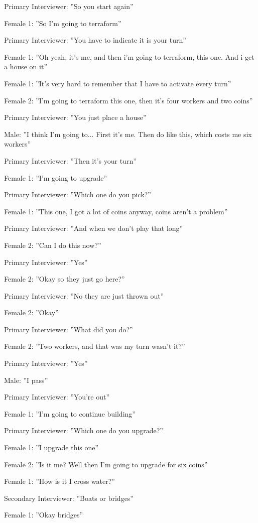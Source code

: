 Primary Interviewer: ”So you start again”

Female 1: ”So I’m going to terraform”

Primary Interviewer: ”You have to indicate it is your turn”

Female 1: ”Oh yeah, it’s me, and then i’m going to terraform, this one. And i get a house on it”

Female 1: ”It’s very hard to remember that I have to activate every turn”

Female 2: ”I’m going to terraform this one, then it’s four workers and two coins”

Primary Interviewer: ”You just place a house”

Male: ”I think I’m going to... First it’s me. Then do like this, which costs me six workers”

Primary Interviewer: ”Then it’s your turn”

Female 1: ”I’m going to upgrade”

Primary Interviewer: ”Which one do you pick?”

Female 1: ”This one, I got a lot of coins anyway, coins aren’t a problem”

Primary Interviewer: ”And when we don’t play that long”

Female 2: ”Can I do this now?”

Primary Interviewer: ”Yes”

Female 2: ”Okay so they just go here?”

Primary Interviewer: ”No they are just thrown out”

Female 2: ”Okay”

Primary Interviewer: ”What did you do?”

Female 2: ”Two workers, and that was my turn wasn’t it?”

Primary Interviewer: ”Yes”

Male: ”I pass”

Primary Interviewer: ”You’re out”

Female 1: ”I’m going to continue building”

Primary Interviewer: ”Which one do you upgrade?”

Female 1: ”I upgrade this one”

Female 2: ”Is it me? Well then I’m going to upgrade for six coins”

Female 1: ”How is it I cross water?”

Secondary Interviewer: ”Boats or bridges”

Female 1: ”Okay bridges”

